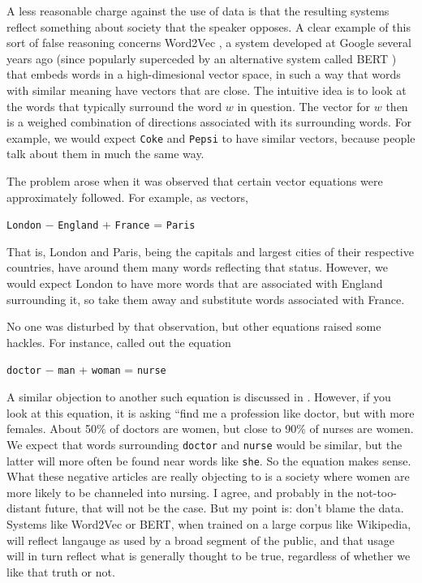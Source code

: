 \documentclass[11pt]{article}
\begin{document}
A less reasonable charge against the use of data is that the resulting systems reflect something about society that the speaker opposes.  A clear example of this sort of false reasoning concerns Word2Vec \cite{word2vec}, a system developed at Google several years ago (since popularly superceded by an alternative system called BERT \cite{bert}) that embeds words in a high-dimesional vector space, in such a way that words with similar meaning have vectors that are close.  The intuitive idea is to look at the words that typically surround the word $w$ in question.  The vector for $w$ then is a weighed combination of directions associated with its surrounding words.  For example, we would expect {\tt Coke} and {\tt Pepsi} to have similar vectors, because people talk about them in much the same way.

The problem arose when it was observed that certain vector equations were approximately followed.  For example, as vectors,

\begin{center}
{\tt London} $-$ {\tt England} + {\tt France} = {\tt Paris}
\end{center}
That is, London and Paris, being the capitals and largest cities of their respective countries, have around them many words reflecting that status.  However, we would expect London to have more words that are associated with England surrounding it, so take them away and substitute words associated with France.

No one was disturbed by that observation, but other equations raised some hackles.  For instance, \cite{buono} called out the equation

\begin{center}
{\tt doctor} $-$ {\tt man} + {\tt woman} = {\tt nurse}
\end{center}
A similar objection to another such equation is discussed in \cite{boluk}.  However, if you look at this equation, it is asking ``find me a profession like doctor, but with more females.  About 50\% of doctors are women, but close to 90\% of nurses are women.  We expect that words surrounding {\tt doctor} and {\tt nurse} would be similar, but the latter will more often be found near words like {\tt she}.  So the equation makes sense.  What these negative articles are really objecting to is a society where women are more likely to be channeled into nursing.  I agree, and probably in the not-too-distant future, that will not be the case.  But my point is: don't blame the data.  Systems like Word2Vec or BERT, when trained on a large corpus like Wikipedia, will reflect langauge as used by a broad segment of the public, and that usage will in turn reflect what is generally thought to be true, regardless of whether we like that truth or not.
\end{document}
